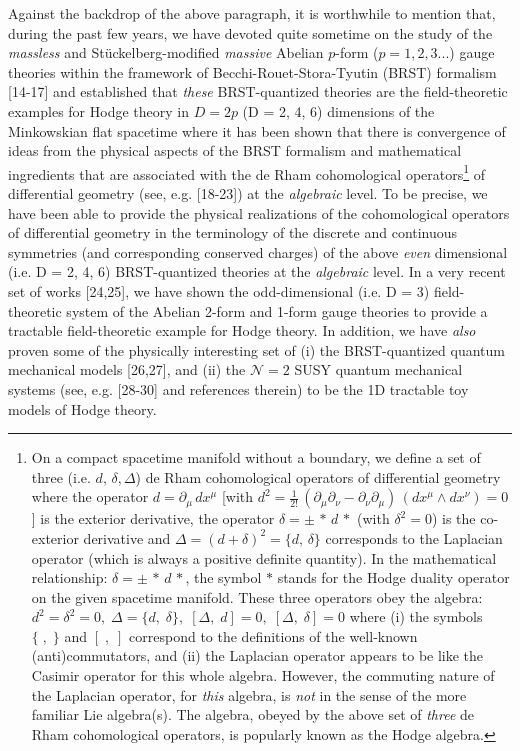 \documentclass[12pt]{article}
\begin{document}
Against the backdrop of the above paragraph, it is worthwhile to mention that, during the past few years, we have devoted quite sometime on the study of the
{\it massless} and St{\" u}ckelberg-modified {\it massive} Abelian $p$-form ($ p = 1, 2, 3...$) gauge theories within the framework of Becchi-Rouet-Stora-Tyutin
(BRST) formalism [14-17] and established that {\it these} BRST-quantized theories are the field-theoretic examples for Hodge theory in $D = 2 p$ 
(D = 2, 4, 6) dimensions of the Minkowskian flat spacetime where it has been shown that there is convergence of ideas from the physical aspects
of the BRST formalism and mathematical ingredients 
that are associated with the de Rham cohomological operators\footnote{On a compact spacetime manifold without a boundary, we define a set of three
(i.e. $d, \, \delta, \Delta $) de Rham cohomological operators of differential geometry where the operator $d = \partial_\mu \, dx^\mu$ [with $d^2 = \frac{1}{2!}\,
(\partial_\mu \partial_\nu - \partial_\nu \partial_\mu)\, (dx^\mu \wedge dx^\nu) = 0$] is the exterior derivative, the operator 
$\delta = \pm\, *\, d\, *$ (with $\delta^2 = 0 $) is the co-exterior derivative and  $\Delta = (d + \delta)^2 = \{d, \,\delta \}$
corresponds to the Laplacian operator (which is always a positive definite quantity). In the mathematical relationship: 
$\delta = \pm\, *\, d\, *$, the symbol $*$ stands for the Hodge duality operator on the given spacetime manifold. These three operators obey the algebra: $d^2 =
\delta^2 = 0, \; \Delta = \{d, \; \delta\}, \; [\Delta, \; d] = 0, \;  [\Delta, \; \delta] = 0$ where (i) the symbols $\{\; ,\;\} $ 
and $[\; , \; ] $ correspond to the
definitions of the well-known (anti)commutators, and (ii) the Laplacian operator appears to be like the 
Casimir operator for this whole algebra. However, the commuting nature of 
the Laplacian operator, for {\it this} algebra, is {\it not}  in the sense of the more familiar Lie algebra(s). The algebra, obeyed by 
the above set of {\it three} de Rham  cohomological operators, is popularly known as 
the Hodge algebra.} of differential geometry (see, e.g. [18-23]) at the {\it algebraic} level.
To be precise, we have been able to provide the physical realizations of the cohomological operators of differential geometry in the terminology of the
discrete and continuous symmetries (and corresponding conserved charges) of the above 
{\it even} dimensional (i.e. D = 2, 4, 6) BRST-quantized theories at the {\it algebraic} level. In a  very recent set of works [24,25], we have shown the
odd-dimensional (i.e. D = 3) field-theoretic system of the Abelian 2-form and 1-form gauge  theories to 
provide a tractable field-theoretic example for Hodge theory. 
In addition, we have {\it also} proven some of the physically interesting set of (i) the 
BRST-quantized quantum mechanical models [26,27], and (ii) the  $\mathcal {N} = 2$ SUSY quantum mechanical 
systems (see, e.g. [28-30] and references therein)  to be the 1D tractable toy models of Hodge theory.
\end{document}
